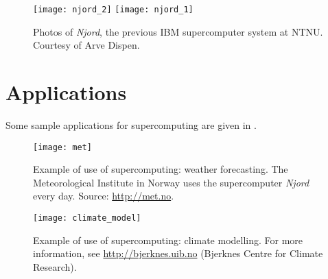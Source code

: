 \begin{figure}
  \centering
  \texttt{[image: njord\_2]}
  \texttt{[image: njord\_1]}
  \caption{
    Photos of \emph{Njord}, the previous IBM supercomputer system at NTNU.
    Courtesy of Arve Dispen.
  }
  \label{fig:njord}
\end{figure}

\section{Applications}

Some sample applications for supercomputing are given in .

\vspace{2cm}
\begin{figure}[!ht]
  \centering
  \texttt{[image: met]}
  \caption{
    Example of use of supercomputing: weather forecasting. The Meteorological
    Institute in Norway uses the supercomputer \emph{Njord} every day. Source:
    \protect\url{http://met.no}.
  }
  \label{fig:met}
\end{figure}

\begin{figure}[!ht]
  \centering
  \texttt{[image: climate\_model]}
  \caption{
    Example of use of supercomputing: climate modelling. For more information,
    see \protect\url{http://bjerknes.uib.no} (Bjerknes Centre for Climate Research).
  }
  \label{fig:climate}
\end{figure}
